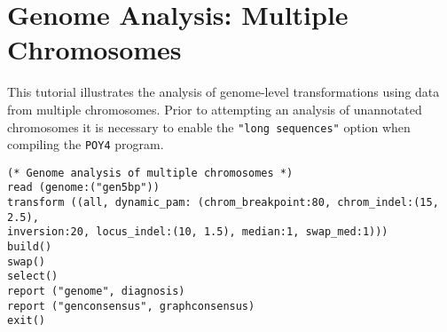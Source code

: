 \section{Genome Analysis: Multiple Chromosomes}{\label{tutorial 9}}

This tutorial illustrates the analysis of genome-level transformations using data from multiple chromosomes. 
Prior to attempting an analysis of unannotated chromosomes it is necessary to enable the \texttt {"long sequences"}
option when compiling the \texttt{POY4} program. 

\begin{verbatim}
(* Genome analysis of multiple chromosomes *)
read (genome:("gen5bp"))
transform ((all, dynamic_pam: (chrom_breakpoint:80, chrom_indel:(15, 2.5), 
inversion:20, locus_indel:(10, 1.5), median:1, swap_med:1)))
build()
swap()
select()
report ("genome", diagnosis)
report ("genconsensus", graphconsensus)
exit()
\end{verbatim}

